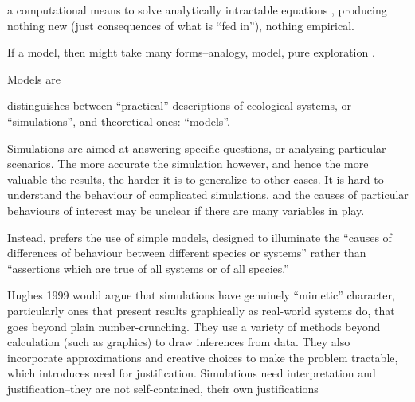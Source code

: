 a computational means to solve analytically intractable equations
\autocite[31]{Winsberg2010}, producing nothing new (just consequences
of what is ``fed in''\autocite{DiPaolo2000}), nothing empirical.


If a model, then might take many forms--analogy, model, pure exploration \autocite{Webb2009}.

Models are 

\autocite{MaynardSmith1974} distinguishes between
``practical'' descriptions of ecological systems, or ``simulations'', and
theoretical ones: ``models''.

Simulations are aimed at answering specific questions, or analysing
particular scenarios. The more accurate the simulation however, and
hence the more valuable the results, the harder it is to generalize to
other cases. It is hard to understand the behaviour of complicated
simulations, and the causes of particular behaviours of interest may be
unclear if there are many variables in play.

Instead, \autocite{MaynardSmith1974} prefers the use of simple models, designed
to illuminate the ``causes of differences of behaviour between different
species or systems'' rather than ``assertions which are true of all
systems or of all species.''

Hughes 1999 would argue that simulations have genuinely ``mimetic''
character, particularly ones that present results graphically as
real-world systems do, that goes beyond plain number-crunching. They use
a variety of methods beyond calculation (such as graphics) to draw
inferences from data. They also incorporate approximations and creative
choices to make the problem tractable, which introduces need for
justification. Simulations need interpretation and justification--they
are not self-contained, their own justifications
\autocite[31]{Winsberg2010}

\label{simulations-are-themselves-an-instance-of-the-thing}


